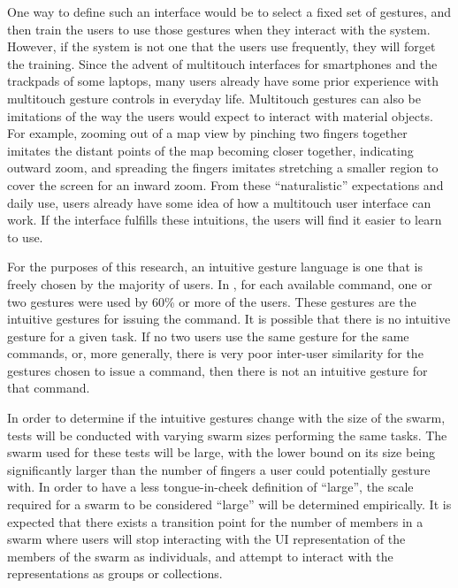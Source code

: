 \documentclass[]{article}
\begin{document}
One way to define such an interface would be to select a fixed set of gestures, and then train the users to use those gestures when they interact with the system. 
However, if the system is not one that the users use frequently, they will forget the training. 
Since the advent of multitouch interfaces for smartphones and the trackpads of some laptops, many users already have some prior experience with multitouch gesture controls in everyday life. 
Multitouch gestures can also be imitations of the way the users would expect to interact with material objects. 
For example, zooming out of a map view by pinching two fingers together imitates the distant points of the map becoming closer together, indicating outward zoom, and spreading the fingers imitates stretching a smaller region to cover the screen for an inward zoom. 
From these ``naturalistic'' expectations and daily use, users already have some idea of how a multitouch user interface can work. 
If the interface fulfills these intuitions, the users will find it easier to learn to use. 

For the purposes of this research, an intuitive gesture language is one that is freely chosen by the majority of users. 
In \cite{Micire:2009:ANG:1731903.1731912}, for each available command, one or two gestures were used by 60\% or more of the users. 
These gestures are the intuitive gestures for issuing the command. 
It is possible that there is no intuitive gesture for a given task.
If no two users use the same gesture for the same commands, or, more generally, there is very poor inter-user similarity for the gestures chosen to issue a command, then there is not an intuitive gesture for that command.

In order to determine if the intuitive gestures change with the size of the swarm, tests will be conducted with varying swarm sizes performing the same tasks. 
The swarm used for these tests will be large, with the lower bound on its size being significantly larger than the number of fingers a user could potentially gesture with. 
In order to have a less tongue-in-cheek definition of ``large'', the scale required for a swarm to be considered ``large'' will be determined empirically.
It is expected that there exists a transition point for the number of members in a swarm where users will stop interacting with the UI representation of the members of the swarm as individuals, and attempt to interact with the representations as groups or collections. 
\end{document}
